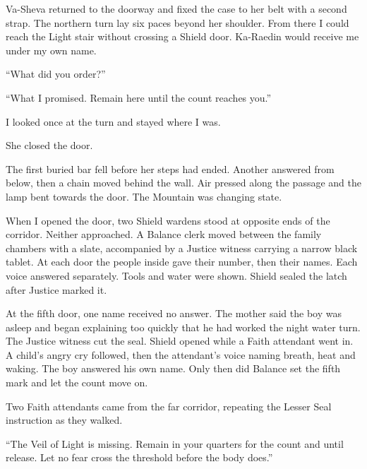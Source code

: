 Va-Sheva returned to the doorway and fixed the case to her belt with a second strap. The northern turn lay six paces beyond her shoulder. From there I could reach the Light stair without crossing a Shield door. Ka-Raedin would receive me under my own name.\par

``What did you order?''\par

``What I promised. Remain here until the count reaches you.''\par

I looked once at the turn and stayed where I was.\par

She closed the door.\par

\ornament

The first buried bar fell before her steps had ended. Another answered from below, then a chain moved behind the wall. Air pressed along the passage and the lamp bent towards the door. The Mountain was changing state.\par

When I opened the door, two Shield wardens stood at opposite ends of the corridor. Neither approached. A Balance clerk moved between the family chambers with a slate, accompanied by a Justice witness carrying a narrow black tablet. At each door the people inside gave their number, then their names. Each voice answered separately. Tools and water were shown. Shield sealed the latch after Justice marked it.\par

At the fifth door, one name received no answer. The mother said the boy was asleep and began explaining too quickly that he had worked the night water turn. The Justice witness cut the seal. Shield opened while a Faith attendant went in. A child's angry cry followed, then the attendant's voice naming breath, heat and waking. The boy answered his own name. Only then did Balance set the fifth mark and let the count move on.\par

Two Faith attendants came from the far corridor, repeating the Lesser Seal instruction as they walked.\par

``The Veil of Light is missing. Remain in your quarters for the count and until release. Let no fear cross the threshold before the body does.''\par


